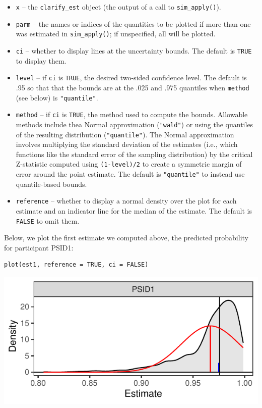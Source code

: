 \begin{itemize}
\item
  \texttt{x} -- the \texttt{clarify\_est} object (the output of a call to \texttt{sim\_apply()}).
\item
  \texttt{parm} -- the names or indices of the quantities to be plotted if more than one was estimated in \texttt{sim\_apply()}; if unspecified, all will be plotted.
\item
  \texttt{ci} -- whether to display lines at the uncertainty bounds. The default is \texttt{TRUE} to display them.
\item
  \texttt{level} -- if \texttt{ci} is \texttt{TRUE}, the desired two-sided confidence level. The default is .95 so that that the bounds are at the .025 and .975 quantiles when \texttt{method} (see below) is \texttt{"quantile"}.
\item
  \texttt{method} -- if \texttt{ci} is \texttt{TRUE}, the method used to compute the bounds. Allowable methods include thea Normal approximation (\texttt{"wald"}) or using the quantiles of the resulting distribution (\texttt{"quantile"}). The Normal approximation involves multiplying the standard deviation of the estimates (i.e., which functions like the standard error of the sampling distribution) by the critical Z-statistic computed using \texttt{(1-level)/2} to create a symmetric margin of error around the point estimate. The default is \texttt{"quantile"} to instead use quantile-based bounds.
\item
  \texttt{reference} -- whether to display a normal density over the plot for each estimate and an indicator line for the median of the estimate. The default is \texttt{FALSE} to omit them.
\end{itemize}

Below, we plot the first estimate we computed above, the predicted probability for participant PSID1:

\begin{verbatim}
plot(est1, reference = TRUE, ci = FALSE)
\end{verbatim}

\begin{center}\includegraphics{figures/plot1-1} \end{center}

